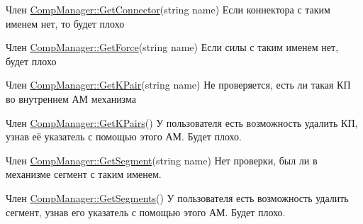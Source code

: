 \label{bug__bug000011}
\hypertarget{bug__bug000011}{}
 
\begin{DoxyDescription}
\item[Член \hyperlink{class_comp_manager_a7c71c8cd9c3d554bdad12e20e1fe5385}{CompManager::GetConnector}(string name) ]Если коннектора с таким именем нет, то будет плохо 
\end{DoxyDescription}

\label{bug__bug000014}
\hypertarget{bug__bug000014}{}
 
\begin{DoxyDescription}
\item[Член \hyperlink{class_comp_manager_a3fb340abc60404300b573ecbd3194e48}{CompManager::GetForce}(string name) ]Если силы с таким именем нет, будет плохо 
\end{DoxyDescription}

\label{bug__bug000007}
\hypertarget{bug__bug000007}{}
 
\begin{DoxyDescription}
\item[Член \hyperlink{class_comp_manager_a339db4176aa621f6ee5571ac0b26635a}{CompManager::GetKPair}(string name) ]Не проверяется, есть ли такая КП во внутреннем АМ механизма 
\end{DoxyDescription}

\label{bug__bug000017}
\hypertarget{bug__bug000017}{}
 
\begin{DoxyDescription}
\item[Член \hyperlink{class_comp_manager_a8f9c981e2d449679b7c2e41d6904d6f0}{CompManager::GetKPairs}() ]У пользователя есть возможность удалить КП, узнав её указатель с помощью этого АМ. Будет плохо. 
\end{DoxyDescription}

\label{bug__bug000004}
\hypertarget{bug__bug000004}{}
 
\begin{DoxyDescription}
\item[Член \hyperlink{class_comp_manager_a27e3139830fad4ef9585d614cafadfe4}{CompManager::GetSegment}(string name) ]Нет проверки, был ли в механизме сегмент с таким именем. 
\end{DoxyDescription}

\label{bug__bug000016}
\hypertarget{bug__bug000016}{}
 
\begin{DoxyDescription}
\item[Член \hyperlink{class_comp_manager_ad06433257a643f6c256d0f5d6a886266}{CompManager::GetSegments}() ]У пользователя есть возможность удалить сегмент, узнав его указатель с помощью этого АМ. Будет плохо. 
\end{DoxyDescription}

